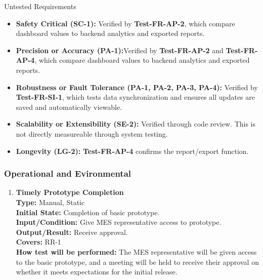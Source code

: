 \documentclass[12pt, titlepage]{article}
\begin{document}
\begin{enumerate}[label=\bfseries PF-\arabic*:, wide=0pt]
{Untested Requirements}
\begin{itemize}
    \item \textbf{Safety Critical (SC-1):} Verified by \textbf{Test-FR-AP-2}, which compare dashboard values to backend analytics and exported reports.

    \item \textbf{Precision or Accuracy (PA-1):}Verified by \textbf{Test-FR-AP-2} and \textbf{Test-FR-AP-4}, which compare dashboard values to backend analytics and exported reports.
  
    \item \textbf{Robustness or Fault Tolerance (PA-1, PA-2, PA-3, PA-4):} Verified by \textbf{Test-FR-SI-1}, which tests data synchronization and ensures all updates are saved and automatically viewable.
    
    \item \textbf{Scalability or Extensibility (SE-2):} Verified through code review. This is not directly measureable through system testing.

    \item \textbf{Longevity (LG-2):} \textbf{Test-FR-AP-4} confirms the report/export function.
\end{itemize}

\end{enumerate}

\subsubsection{Operational and Evironmental}
\begin{enumerate}[label=\bfseries OE-\arabic*:, wide=0pt]
  \item \label{test-OE1} \textbf{Timely Prototype Completion}\\[2mm]
    {\bf Type:} Manual, Static\\
    {\bf Initial State:} Completion of basic prototype.\\
    {\bf Input/Condition:} Give MES representative access to prototype.\\
    {\bf Output/Result:} Receive approval.\\
    {\bf Covers:} RR-1\\
    {\bf How test will be performed:} The MES representative will be given access to the basic prototype, and a meeting will be held to receive their approval on whether it meets expectations for the initial release.
\end{enumerate}
\end{document}
